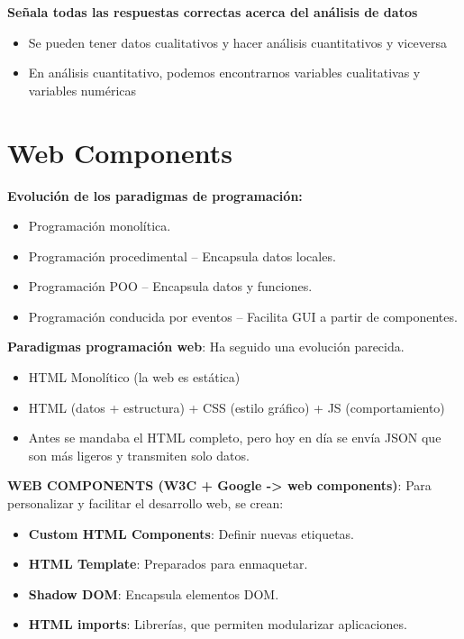 \documentclass[12pt]{report} %
\begin{document}
\textbf{Señala todas las respuestas correctas acerca del análisis de datos}
\begin{itemize}
  \item Se pueden tener datos cualitativos y hacer análisis cuantitativos y viceversa
  \item En análisis cuantitativo, podemos encontrarnos variables cualitativas y variables numéricas
\end{itemize}

\chapter{Web Components}

\textbf{Evolución de los paradigmas de programación:}

\begin{itemize}
  \item Programación monolítica.
  \item Programación procedimental -- Encapsula datos locales.
  \item Programación POO -- Encapsula datos y funciones.
  \item Programación conducida por eventos -- Facilita GUI a partir de componentes.
\end{itemize}

\textbf{Paradigmas programación web}: Ha seguido una evolución parecida.

\begin{itemize}
\item HTML Monolítico (la web es estática)
\item HTML (datos + estructura) + CSS (estilo gráfico) + JS (comportamiento)
\item Antes se mandaba el HTML completo, pero hoy en día se envía JSON que son más ligeros y transmiten solo datos.
\end{itemize}

\textbf{WEB COMPONENTS (W3C + Google -\textgreater{} web components)}: Para personalizar y facilitar el desarrollo web, se crean:

\begin{itemize}
\item
  \textbf{Custom HTML Components}: Definir nuevas etiquetas.
\item
  \textbf{HTML Template}: Preparados para enmaquetar.
\item
  \textbf{Shadow DOM}: Encapsula elementos DOM.
\item
  \textbf{HTML imports}: Librerías, que permiten modularizar
  aplicaciones.
\end{itemize}
\end{document}
